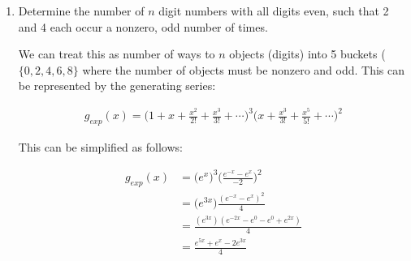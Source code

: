 \documentclass{report}
\begin{document}
{\begin{enumerate}
          A maximal triangle of size $m$ will have $\frac{m(m+1)}{2}$ "parts" as it can be constructed by constructing a square of $m \times m + 1$ and removing the top right part to leave the maximal triangle. Additionally, partitions with no part bigger than $m$ (i.e. a Ferrer Diagram with a maximum width of $m$) is represented by the generating series $\prod_{k=1}^{m} \frac{1}{1-x^k}$. In total, it is clear that

          \begin{align*}
              g(x) & = \sum_{m\ge 1} \Bigg ( \Big ( x^{\frac{m(m+1)}{2}} \Big ) \Bigg ( \prod_{k=1}^{m} \frac{1}{1-x^k} \Bigg ) \Bigg ) \\
                   & = \sum_{m\ge 1} \frac{x^{\frac{m(m+1)}{2}}}{\prod_{k=1}^{m}1-x^k}
          \end{align*}

          However, this bijection process does not hold for when $n=1$ as there will not be any element in the second part of the tuple. So, we must account for the $1$ missing element that is not being counted in this generating series. Thus,

          \begin{align*}
              \prod_{k\ge 1}(1 + x^k) = 1 + \sum_{m\ge 1} \frac{x^{\frac{m(m+1)}{2}}}{\prod_{k=1}^{m}1-x^k}
          \end{align*}

    \item Determine the number of $n$ digit numbers with all digits even, such that 2 and 4 each occur a nonzero, odd number of times.

          We can treat this as number of ways to $n$ objects (digits) into 5 buckets ($\{0,2,4,6,8\}$ where the number of objects must be nonzero and odd. This can be represented by the generating series:

          \begin{align*}
              g_{exp}(x) = \Big (1 + x + \frac{x^2}{2!} + \frac{x^3}{3!} + \cdots \Big )^3 \Big (x + \frac{x^3}{3!} + \frac{x^5}{5!} + \cdots \Big )^2
          \end{align*}

          This can be simplified as follows:

          \begin{align*}
              g_{exp}(x) & = \big ( e^x \big )^3 \Big ( \frac{e^{-x} - e^{x}}{-2} \Big )^2 \\
                         & = \big ( e^{3x} \big) \frac{(e^{-x} - e^{x})^2}{4}              \\
                         & = \frac{ ( e^{3x} ) ( e^{-2x} - e^{0} - e^{0} + e^{2x} ) }{4}   \\
                         & = \frac{e^{5x} + e^{x} - 2e^{3x}}{4}                            \\
          \end{align*}


\end{enumerate}}
\end{document}
